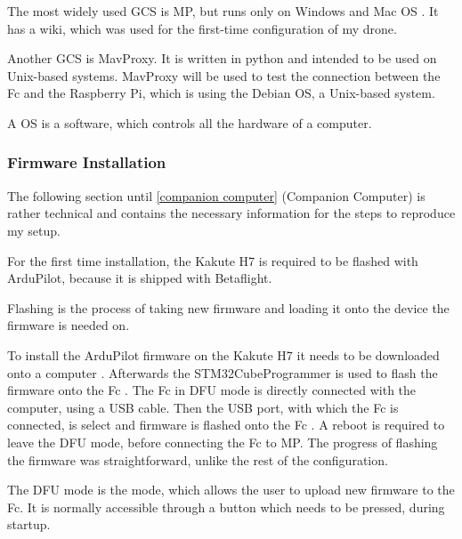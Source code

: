 \documentclass[svgnames]{article}
\begin{document}
	The most widely used \gls{GCS} is \gls{MP}, but runs only on Windows and Mac OS \cite{MissionPlanner}. It has a wiki, which was used for the first-time configuration of my drone. 
	
	Another \gls{GCS} is MavProxy. It is written in python and intended to be used on Unix-based systems. MavProxy will be used to test the connection between the \gls{Fc} and the Raspberry Pi, which is using the Debian \gls{OS}, a Unix-based system.
	\begin{Explanation}
		\item A \gls{OS} is a software, which controls all the hardware of a computer.
	\end{Explanation}

	\subsubsection{Firmware Installation}
	The following section until \cref{companion computer} (Companion Computer) is rather technical and contains the necessary information for the steps to reproduce my setup.
	
	For the first time installation, the Kakute H7 is required to be flashed with ArduPilot, because it is shipped with Betaflight. 
	\begin{Explanation}[to flash]
		\item Flashing is the process of taking new firmware and loading it onto the device the firmware is needed on.
	\end{Explanation} 
	To install the ArduPilot firmware on the Kakute H7  it needs to be downloaded onto a computer \cite{ArduPilotFirmware}. Afterwards the STM32CubeProgrammer is used to flash the firmware onto the Fc \cite{STM32CubeProgrammer}. The \gls{Fc} in \gls{DFU} mode is directly connected with the computer, using a USB cable. Then the USB port, with which the \gls{Fc} is connected, is select and firmware is flashed onto the \gls{Fc} . A reboot is required to leave the \gls{DFU} mode, before connecting the \gls{Fc} to \gls{MP}. The progress of flashing the firmware was straightforward, unlike the rest of the configuration.

	
	\begin{Explanation}%
		\item The \gls{DFU} mode is the mode, which allows the user to upload new firmware to the \gls{Fc}. It is normally accessible through a button which needs to be pressed, during startup.
	\end{Explanation}
\end{document}
